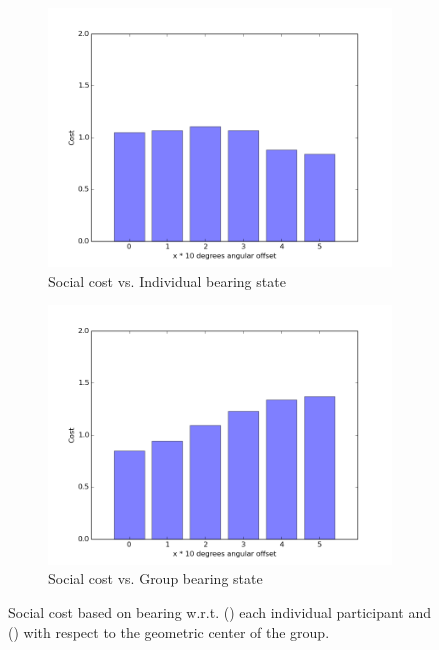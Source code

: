 \documentclass[a4paper,11pt]{report}
\begin{document}
 \begin{figure}
    \centering
    \begin{subfigure}[b]{0.45\textwidth}
        \includegraphics[width=\textwidth]{figures/cost_twente_data.png}
        \caption{Social cost vs. Individual bearing state}
        \label{fig:cost_twente_1}
    \end{subfigure}
    \begin{subfigure}[b]{0.45\textwidth}
        \includegraphics[width=\textwidth]{figures/cost_twente_data_COM.png}
        \caption{Social cost vs. Group bearing state}
        \label{fig:cost_twente_2}
    \end{subfigure}
    \caption{Social cost based on bearing w.r.t. () each individual participant and () with respect to the geometric center of the group.}
    \label{fig:social_cost_function_twente}
\end{figure}
\end{document}
